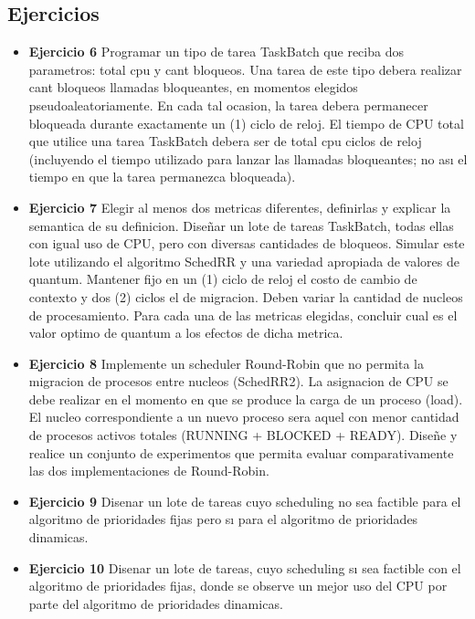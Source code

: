 
\subsection{Ejercicios}
\begin{itemize}
 
\item \textbf{Ejercicio 6}  Programar un tipo de tarea TaskBatch que reciba dos parametros: total cpu y
cant bloqueos. Una tarea de este tipo debera realizar cant bloqueos llamadas bloqueantes, en
momentos elegidos pseudoaleatoriamente. En cada tal ocasion, la tarea debera permanecer
bloqueada durante exactamente un (1) ciclo de reloj. El tiempo de CPU total que utilice una
tarea TaskBatch debera ser de total cpu ciclos de reloj (incluyendo el tiempo utilizado para
lanzar las llamadas bloqueantes; no ası el tiempo en que la tarea permanezca bloqueada).

\item \textbf{Ejercicio 7} Elegir al menos dos metricas diferentes, definirlas y explicar la semantica de
su definicion. Diseñar un lote de tareas TaskBatch, todas ellas con igual uso de CPU, pero
con diversas cantidades de bloqueos. Simular este lote utilizando el algoritmo SchedRR y una
variedad apropiada de valores de quantum. Mantener fijo en un (1) ciclo de reloj el costo de
cambio de contexto y dos (2) ciclos el de migracion. Deben variar la cantidad de nucleos de
procesamiento. Para cada una de las metricas elegidas, concluir cual es el valor optimo de
quantum a los efectos de dicha metrica.

\item \textbf{Ejercicio 8} Implemente un scheduler Round-Robin que no permita la migracion de procesos
entre nucleos (SchedRR2). La asignacion de CPU se debe realizar en el momento en que se produce la carga 
de un proceso (load). El nucleo correspondiente a un nuevo proceso sera aquel
con menor cantidad de procesos activos totales (RUNNING + BLOCKED + READY). Diseñe y realice un conjunto 
de experimentos que permita evaluar comparativamente las dos implementaciones de Round-Robin.

\item \textbf{Ejercicio 9} Disenar un lote de tareas cuyo scheduling no sea factible para el algoritmo de
prioridades fijas pero sı para el algoritmo de prioridades dinamicas.

\item \textbf{Ejercicio 10} Disenar un lote de tareas, cuyo scheduling sı sea factible con el algoritmo de
prioridades fijas, donde se observe un mejor uso del CPU por parte del algoritmo de prioridades
dinamicas.
\end{itemize}
